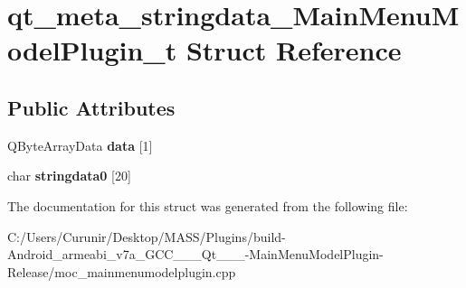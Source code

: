 \hypertarget{structqt__meta__stringdata___main_menu_model_plugin__t}{}\section{qt\+\_\+meta\+\_\+stringdata\+\_\+\+Main\+Menu\+Model\+Plugin\+\_\+t Struct Reference}
\label{structqt__meta__stringdata___main_menu_model_plugin__t}
\subsection*{Public Attributes}
\begin{DoxyCompactItemize}
\item 
\mbox{\label{structqt__meta__stringdata___main_menu_model_plugin__t_a1de01247619e04ece52ade945f260169}} 
Q\+Byte\+Array\+Data {\bfseries data} \mbox{[}1\mbox{]}
\item 
\mbox{\label{structqt__meta__stringdata___main_menu_model_plugin__t_acb8cbbc19e905764a69736ff744030b4}} 
char {\bfseries stringdata0} \mbox{[}20\mbox{]}
\end{DoxyCompactItemize}


The documentation for this struct was generated from the following file\+:\begin{DoxyCompactItemize}
\item 
C\+:/\+Users/\+Curunir/\+Desktop/\+M\+A\+S\+S/\+Plugins/build-\/\+Android\+\_\+armeabi\+\_\+v7a\+\_\+\+G\+C\+C\+\_\+\_\+\_\+\+Qt\+\_\+\_\+\_-\/\+Main\+Menu\+Model\+Plugin-\/\+Release/moc\+\_\+mainmenumodelplugin.\+cpp\end{DoxyCompactItemize}
